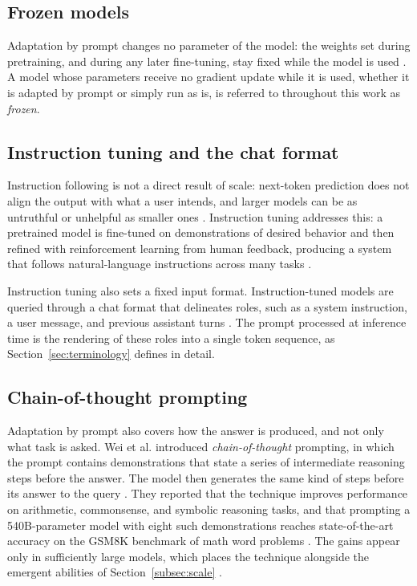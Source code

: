 \subsection{Frozen models}
\label{subsec:frozen}

Adaptation by prompt changes no parameter of the model: the weights set during pretraining, and during any later fine-tuning, stay fixed while the model is used \cite{bommasaniOpportunitiesRisksFoundation2022,brownLanguageModelsAre2020}. A model whose parameters receive no gradient update while it is used, whether it is adapted by prompt or simply run as is, is referred to throughout this work as \emph{frozen}.

\subsection{Instruction tuning and the chat format}
\label{subsec:instruction-tuning}

Instruction following is not a direct result of scale: next-token prediction does not align the output with what a user intends, and larger models can be as untruthful or unhelpful as smaller ones \cite{ouyangTrainingLanguageModels2022}. Instruction tuning addresses this: a pretrained model is fine-tuned on demonstrations of desired behavior and then refined with reinforcement learning from human feedback, producing a system that follows natural-language instructions across many tasks \cite{ouyangTrainingLanguageModels2022, zhaoSurveyLargeLanguage2026}.

Instruction tuning also sets a fixed input format. Instruction-tuned models are queried through a chat format that delineates roles, such as a system instruction, a user message, and previous assistant turns \cite{openaiGptoss120bGptoss20bModel2025}. The prompt processed at inference time is the rendering of these roles into a single token sequence, as Section~\ref{sec:terminology} defines in detail.

\subsection{Chain-of-thought prompting}
\label{subsec:chain-of-thought}

Adaptation by prompt also covers how the answer is produced, and not only what task is asked. Wei et al. introduced \emph{chain-of-thought} prompting, in which the prompt contains demonstrations that state a series of intermediate reasoning steps before the answer. The model then generates the same kind of steps before its answer to the query \cite{weiChainofThoughtPromptingElicits2023}. They reported that the technique improves performance on arithmetic, commonsense, and symbolic reasoning tasks, and that prompting a 540B-parameter model with eight such demonstrations reaches state-of-the-art accuracy on the GSM8K benchmark of math word problems \cite{weiChainofThoughtPromptingElicits2023}. The gains appear only in sufficiently large models, which places the technique alongside the emergent abilities of Section~\ref{subsec:scale} \cite{weiChainofThoughtPromptingElicits2023, weiEmergentAbilitiesLarge2022}.

